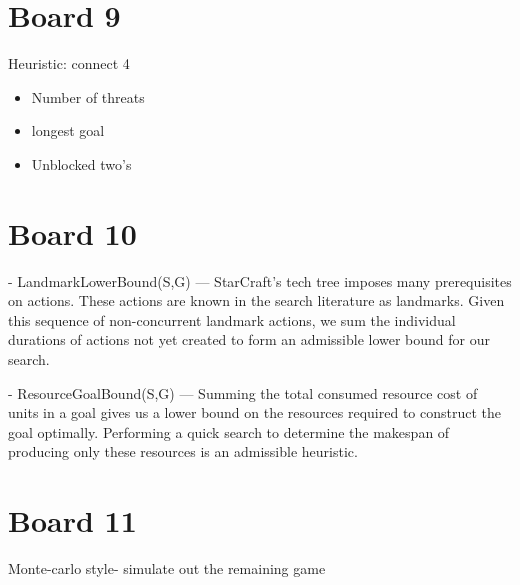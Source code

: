 \documentclass[10pt]{article}
\begin{document}
\begin{algorithm}[h]
\begin{algorithmic}[1]
  \EndFor{}
  \EndFor{}
  \EndIf{}
  \EndProcedure{}
\end{algorithmic}
\end{algorithm}


\section{Board 9}

Heuristic: connect 4

\begin{itemize}
\item Number of threats
\item longest goal
\item Unblocked two's
\end{itemize}

\section{Board 10}

- LandmarkLowerBound(S,G) — StarCraft’s tech tree
imposes many prerequisites on actions. These actions are
known in the search literature as landmarks. Given this sequence
of non-concurrent landmark actions, we sum the individual
durations of actions not yet created to form an admissible
lower bound for our search.

- ResourceGoalBound(S,G) — Summing the total consumed
resource cost of units in a goal gives us a lower bound
on the resources required to construct the goal optimally.
Performing a quick search to determine the makespan of
producing only these resources is an admissible heuristic.

\section{Board 11}

Monte-carlo style- simulate out the remaining game
\end{document}
